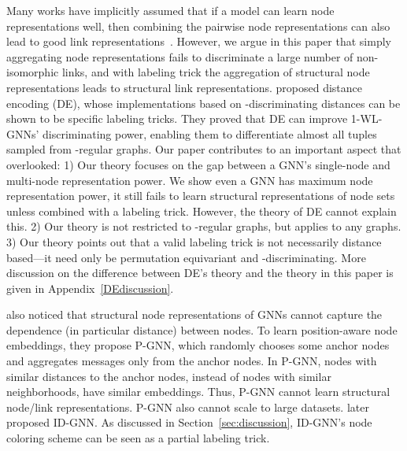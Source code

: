 \documentclass{article}
\begin{document}
Many works have implicitly assumed that if a model can learn node representations well, then combining the pairwise node representations can also lead to good link representations~\citep{grover2016node2vec,kipf2016variational,hamilton2017inductive}. However, we argue in this paper that simply aggregating node representations fails to discriminate a large number of non-isomorphic links, and with labeling trick the aggregation of structural node representations leads to structural link representations. \citet{li2020distance} proposed distance encoding (DE), whose implementations based on -discriminating distances can be shown to be specific labeling tricks. They proved that DE can improve 1-WL-GNNs' discriminating power, enabling them to differentiate almost all  tuples sampled from -regular graphs. Our paper contributes to an important aspect that \citet{li2020distance} overlooked: 1) Our theory focuses on the gap between a GNN's single-node and multi-node representation power. We show even a GNN has maximum node representation power, it still fails to learn structural representations of node sets unless combined with a labeling trick. However, the theory of DE cannot explain this. 2) Our theory is not restricted to -regular graphs, but applies to any graphs. 3) Our theory points out that a valid labeling trick is not necessarily distance based---it need only be permutation equivariant and -discriminating. More discussion on the difference between DE's theory and the theory in this paper is given in Appendix~\ref{DEdiscussion}.









\citet{you2019position} also noticed that structural node representations of GNNs cannot capture the dependence (in particular distance) between nodes. To learn position-aware node embeddings, they propose P-GNN, which randomly chooses some anchor nodes and aggregates messages only from the anchor nodes. In P-GNN, nodes with similar distances to the anchor nodes, instead of nodes with similar neighborhoods, have similar embeddings. Thus, P-GNN cannot learn structural node/link representations. P-GNN also cannot scale to large datasets. \citet{you2021identity} later proposed ID-GNN. As discussed in Section~\ref{sec:discussion}, ID-GNN's node coloring scheme can be seen as a partial labeling trick.
\end{document}
